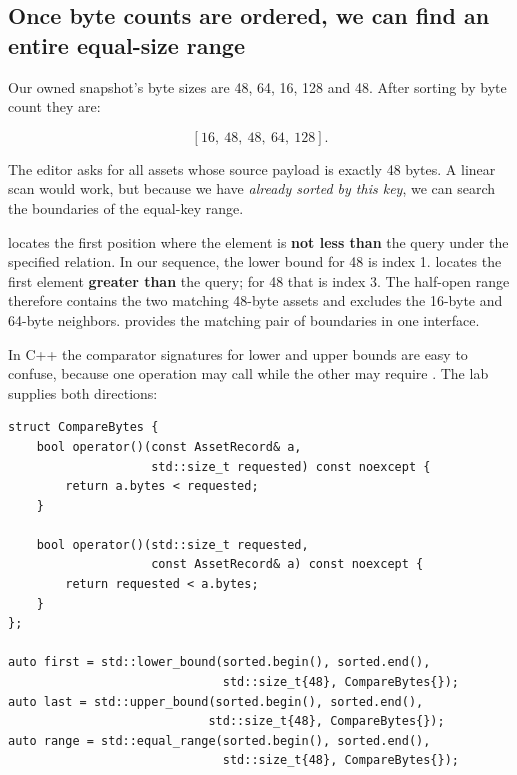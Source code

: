 \subsection{Once byte counts are ordered, we can find an entire equal-size range}\label{01-foundations-i-ch006-once-byte-counts-are-ordered-we-can-find-an-entire-equal-size-range}

\hypertarget{01-foundations-i-ch006-once-byte-counts-are-ordered-we-can-find-an-entire-equal-size-range}{}

Our owned snapshot's byte sizes are 48, 64, 16, 128 and 48. After sorting by byte count they are:

\[
[16,\ 48,\ 48,\ 64,\ 128].
\]

The editor asks for all assets whose source payload is exactly 48 bytes. A linear scan would work, but because we have \emph{already sorted by this key}, we can search the boundaries of the equal-key range.

 locates the first position where the element is \textbf{not less than} the query under the specified relation. In our sequence, the lower bound for 48 is index 1.  locates the first element \textbf{greater than} the query; for 48 that is index 3. The half-open range \BookInlineCode{{{[}}{1}{,}{3}{)}}{{[}1,3)} therefore contains the two matching 48-byte assets and excludes the 16-byte and 64-byte neighbors.  provides the matching pair of boundaries in one interface.

In C++ the comparator signatures for lower and upper bounds are easy to confuse, because one operation may call  while the other may require . The lab supplies both directions:

\begin{verbatim}
struct CompareBytes {
    bool operator()(const AssetRecord& a,
                    std::size_t requested) const noexcept {
        return a.bytes < requested;
    }

    bool operator()(std::size_t requested,
                    const AssetRecord& a) const noexcept {
        return requested < a.bytes;
    }
};

auto first = std::lower_bound(sorted.begin(), sorted.end(),
                              std::size_t{48}, CompareBytes{});
auto last = std::upper_bound(sorted.begin(), sorted.end(),
                            std::size_t{48}, CompareBytes{});
auto range = std::equal_range(sorted.begin(), sorted.end(),
                              std::size_t{48}, CompareBytes{});
\end{verbatim}

